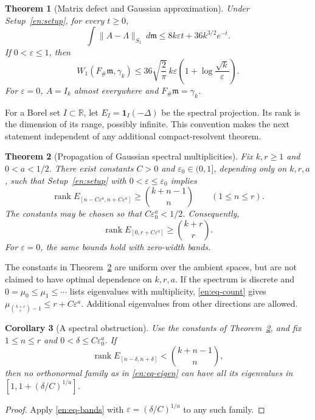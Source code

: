 \documentclass[12pt]{amsart}
\newtheorem{thm}{Theorem}[section]
\newtheorem{cor}[thm]{Corollary}
\theoremstyle{definition}
\theoremstyle{remark}
\numberwithin{equation}{section}
\newcommand{\rank}{\operatorname{rank}}
\newcommand{\R}{\mathbb{R}}
\newcommand{\m}{\mathfrak m}
\theoremstyle{jpplain}
\begin{document}
\begin{thm}[Matrix defect and Gaussian approximation]\label{en:thm-gaussian}
Under Setup~\ref{en:setup}, for every $t\geq0$,
\begin{equation}\label{en:eq-main-matrix}
 \int\|A-\Lambda\|_{S_1}\,d\m
 \leq8k\varepsilon t+36k^{3/2}e^{-t}.
\end{equation}
If $0<\varepsilon\leq1$, then
\begin{equation}\label{en:eq-main-W}
 W_1(F_\#\m,\gamma_k)
 \leq36\sqrt{\frac2\pi}\,k\varepsilon
 \left(1+\log\frac{\sqrt{k}}{\varepsilon}\right).
\end{equation}
For $\varepsilon=0$, $A=I_k$ almost everywhere and $F_\#\m=\gamma_k$.
\end{thm}

For a Borel set $I\subset\R$, let
$E_I=\mathbf1_I(-\Delta)$ be the spectral projection.  Its rank is the
dimension of its range, possibly infinite.  This convention makes the next
statement independent of any additional compact-resolvent theorem.

\begin{thm}[Propagation of Gaussian spectral multiplicities]\label{en:thm-bands}
Fix $k,r\geq1$ and $0<a<1/2$.  There exist constants $C>0$ and
$\varepsilon_0\in(0,1]$, depending only on $k,r,a$, such that
Setup~\ref{en:setup} with $0<\varepsilon\leq\varepsilon_0$ implies
\begin{equation}\label{en:eq-bands}
 \rank E_{[n-C\varepsilon^a,n+C\varepsilon^a]}
 \geq\binom{k+n-1}{n}\qquad(1\leq n\leq r).
\end{equation}
The constants may be chosen so that $C\varepsilon_0^a<1/2$.
Consequently,
\begin{equation}\label{en:eq-count}
 \rank E_{[0,r+C\varepsilon^a]}\geq\binom{k+r}{r}.
\end{equation}
For $\varepsilon=0$, the same bounds hold with zero-width bands.
\end{thm}

The constants in Theorem~\ref{en:thm-bands} are uniform over the ambient
spaces, but are not claimed to have optimal dependence on $k,r,a$.
If the spectrum is discrete and
$0=\mu_0\leq\mu_1\leq\cdots$ lists eigenvalues with multiplicity,
\eqref{en:eq-count} gives
$\mu_{\binom{k+r}{r}-1}\leq r+C\varepsilon^a$.
Additional eigenvalues from other directions are allowed.

\begin{cor}[A spectral obstruction]\label{en:cor-obstruction}
Use the constants of Theorem~\ref{en:thm-bands}, and fix
$1\leq n\leq r$ and $0<\delta\leq C\varepsilon_0^a$.
If
\[
 \rank E_{[n-\delta,n+\delta]}<\binom{k+n-1}{n},
\]
then no orthonormal family as in \eqref{en:eq-eigen} can have all its
eigenvalues in $[1,1+(\delta/C)^{1/a}]$.
\end{cor}
\begin{proof}
Apply \eqref{en:eq-bands} with
$\varepsilon=(\delta/C)^{1/a}$ to any such family.
\end{proof}
\end{document}
